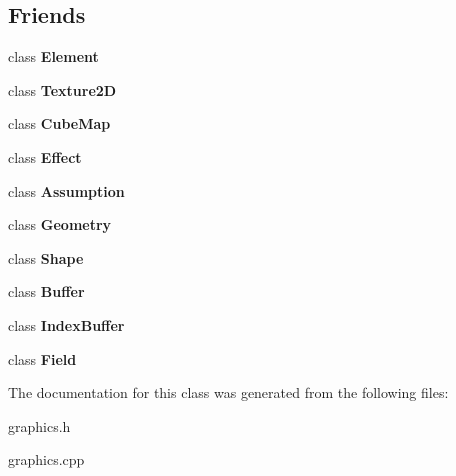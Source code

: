\subsection*{Friends}
\begin{DoxyCompactItemize}
\item 
\hypertarget{classg2c_1_1_model_a016b821f88c7c0a2de1451c175cefbf9}{
class {\bfseries Element}}
\label{classg2c_1_1_model_a016b821f88c7c0a2de1451c175cefbf9}

\item 
\hypertarget{classg2c_1_1_model_aa70951a0328ba29f64176f16b3ea47d8}{
class {\bfseries Texture2D}}
\label{classg2c_1_1_model_aa70951a0328ba29f64176f16b3ea47d8}

\item 
\hypertarget{classg2c_1_1_model_a83d06bada150194666fdc02c043d1080}{
class {\bfseries CubeMap}}
\label{classg2c_1_1_model_a83d06bada150194666fdc02c043d1080}

\item 
\hypertarget{classg2c_1_1_model_ac8649272bb0576cc72f2486439664efe}{
class {\bfseries Effect}}
\label{classg2c_1_1_model_ac8649272bb0576cc72f2486439664efe}

\item 
\hypertarget{classg2c_1_1_model_a6cc942b96f148de5aefd7f1c72801b62}{
class {\bfseries Assumption}}
\label{classg2c_1_1_model_a6cc942b96f148de5aefd7f1c72801b62}

\item 
\hypertarget{classg2c_1_1_model_a9aca7b7350e6ffa0e2d6320834ad1857}{
class {\bfseries Geometry}}
\label{classg2c_1_1_model_a9aca7b7350e6ffa0e2d6320834ad1857}

\item 
\hypertarget{classg2c_1_1_model_a1e1ef8352d0a310bace7f7a3307d1378}{
class {\bfseries Shape}}
\label{classg2c_1_1_model_a1e1ef8352d0a310bace7f7a3307d1378}

\item 
\hypertarget{classg2c_1_1_model_a5ba04a2bf0ca34a0f845cd759950664d}{
class {\bfseries Buffer}}
\label{classg2c_1_1_model_a5ba04a2bf0ca34a0f845cd759950664d}

\item 
\hypertarget{classg2c_1_1_model_a95054ec4e847742ba17d0350fc1fa8fa}{
class {\bfseries IndexBuffer}}
\label{classg2c_1_1_model_a95054ec4e847742ba17d0350fc1fa8fa}

\item 
\hypertarget{classg2c_1_1_model_aaec47a26a3c11c1debd3ed922b69cbd2}{
class {\bfseries Field}}
\label{classg2c_1_1_model_aaec47a26a3c11c1debd3ed922b69cbd2}

\end{DoxyCompactItemize}


The documentation for this class was generated from the following files:\begin{DoxyCompactItemize}
\item 
graphics.h\item 
graphics.cpp\end{DoxyCompactItemize}
